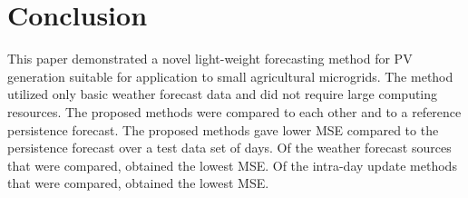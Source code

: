 \section{Conclusion}
\label{sec:conclusion}

This paper demonstrated a novel light-weight forecasting method for PV generation suitable for application to small agricultural microgrids.
The method utilized only basic weather forecast data and did not require large computing resources.
The proposed methods were compared to each other and to a reference persistence forecast.
The proposed methods gave lower MSE compared to the persistence forecast
over a test data set of
 days.
Of the weather forecast sources that were compared,
obtained the lowest MSE.
Of the intra-day update methods that were compared,
obtained the lowest MSE.